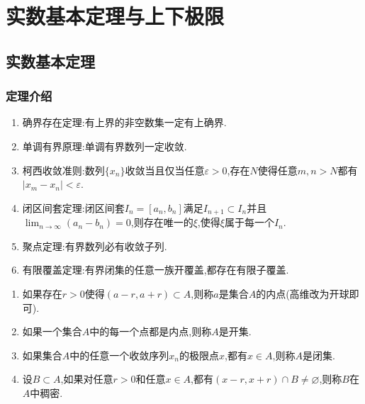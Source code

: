 \documentclass[lang=cn,newtx,10pt,scheme=chinese]{elegantbook}
\begin{document}
\chapter{实数基本定理与上下极限}

\section{实数基本定理}

\subsection{定理介绍}

\begin{theorem}[实数基本定理]\label{theorem:实数基本定理}
\begin{enumerate}
   \item 确界存在定理:有上界的非空数集一定有上确界.
   \item 单调有界原理:单调有界数列一定收敛.
   \item 柯西收敛准则:数列\(\{x_n\}\)收敛当且仅当任意\(\varepsilon > 0\),存在\(N\)使得任意\(m,n > N\)都有\(\vert x_m - x_n\vert < \varepsilon\).
   \item 闭区间套定理:闭区间套\(I_n = [a_n,b_n]\)满足\(I_{n + 1} \subset I_n\)并且\(\lim_{n \to \infty} (a_n - b_n) = 0\),则存在唯一的\(\xi\),使得\(\xi\)属于每一个\(I_n\).
   \item 聚点定理:有界数列必有收敛子列.
   \item 有限覆盖定理:有界闭集的任意一族开覆盖,都存在有限子覆盖.
\end{enumerate}
\end{theorem}

\begin{definition}[点集相关概念]\label{definition:点集相关概念}
\begin{enumerate}
   \item 如果存在\(r > 0\)使得\((a - r,a + r) \subset A\),则称\(a\)是集合\(A\)的内点(高维改为开球即可).
   \item 如果一个集合\(A\)中的每一个点都是内点,则称\(A\)是开集.
   \item 如果集合\(A\)中的任意一个收敛序列\(x_n\)的极限点\(x\),都有\(x\in A\),则称\(A\)是闭集.
   \item 设\(B\subset A\),如果对任意\(r > 0\)和任意\(x\in A\),都有\((x - r,x + r)\cap B\neq\varnothing\),则称\(B\)在\(A\)中稠密.
\end{enumerate}
\end{definition}
\end{document}
